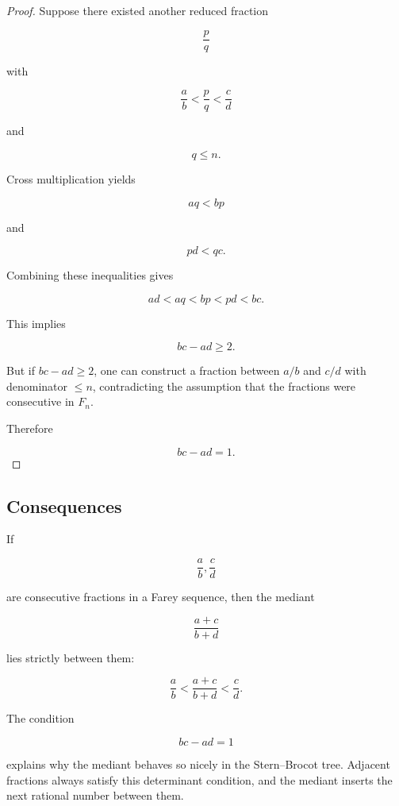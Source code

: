 \begin{proof}
Suppose there existed another reduced fraction

\[
\frac{p}{q}
\]

with

\[
\frac{a}{b} < \frac{p}{q} < \frac{c}{d}
\]

and

\[
q \le n.
\]

Cross multiplication yields

\[
aq < bp
\]

and

\[
pd < qc.
\]

Combining these inequalities gives

\[
ad < aq < bp < pd < bc.
\]

This implies

\[
bc - ad \ge 2.
\]

But if $bc-ad \ge 2$, one can construct a fraction between
$a/b$ and $c/d$ with denominator $\le n$, contradicting the
assumption that the fractions were consecutive in $F_n$.

Therefore

\[
bc - ad = 1.
\]
\end{proof}

\subsection{Consequences}

\begin{theorem}
If

\[
\frac{a}{b}, \frac{c}{d}
\]

are consecutive fractions in a Farey sequence, then the mediant

\[
\frac{a+c}{b+d}
\]

lies strictly between them:

\[
\frac{a}{b}
<
\frac{a+c}{b+d}
<
\frac{c}{d}.
\]
\end{theorem}

\begin{remark}
The condition

\[
bc - ad = 1
\]

explains why the mediant behaves so nicely in the Stern–Brocot tree.
Adjacent fractions always satisfy this determinant condition,
and the mediant inserts the next rational number between them.
\end{remark}

